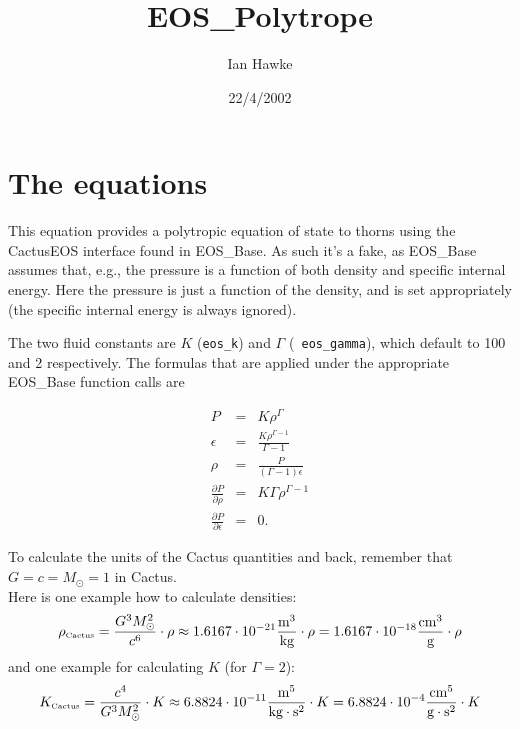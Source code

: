 \documentclass{article}
\begin{document}
\title{EOS\_Polytrope}
\author{Ian Hawke}
\date{22/4/2002}
\maketitle


\section{The equations}
\label{sec:eqn}

This equation provides a polytropic equation of state to thorns using
the CactusEOS interface found in EOS\_Base. As such it's a fake, as
EOS\_Base assumes that, e.g., the pressure is a function of both
density and specific internal energy. Here the pressure is just a
function of the density, and is set appropriately (the specific
internal energy is always ignored).

The two fluid constants are $K$ ({\tt eos\_k}) and $\Gamma$ ({\tt
  eos\_gamma}), which default to 100 and 2 respectively. The formulas
that are applied under the appropriate EOS\_Base function calls are

\begin{eqnarray}
  \label{eq:eosformulas}
  P & = & K \rho^{\Gamma} \\
  \epsilon & = & \frac{K \rho^{\Gamma-1}}{\Gamma - 1} \\
  \rho & = & \frac{P}{(\Gamma - 1) \epsilon} \\
  \frac{\partial P}{\partial \rho} & = & K \Gamma \rho^{\Gamma-1} \\
  \frac{\partial P}{\partial \epsilon} & = & 0.
\end{eqnarray}

To calculate the units of the Cactus quantities and back, remember that
$G=c=M_{\odot}=1$ in Cactus.\\
Here is one example how to calculate densities:
\begin{equation}
 \rho_{\mbox{\tiny Cactus}}=\frac{G^3M_{\odot}^2}{c^6}\cdot \rho
 \approx1.6167\cdot10^{-21}\frac{\mbox{m}^3}{\mbox{kg}}\cdot\rho=
        1.6167\cdot10^{-18}\frac{\mbox{cm}^3}{\mbox{g}}\cdot\rho
\end{equation}
and one example for calculating $K$ (for $\Gamma=2$):
\begin{equation}
 K_{\mbox{\tiny Cactus}}=\frac{c^4}{G^3M_{\odot}^2}\cdot K
 \approx6.8824\cdot10^{-11}\frac{\mbox{m}^5}{\mbox{kg}\cdot\mbox{s}^2}\cdot K=
        6.8824\cdot10^{-4}\frac{\mbox{cm}^5}{\mbox{g}\cdot\mbox{s}^2}\cdot K
\end{equation}




\end{document}
